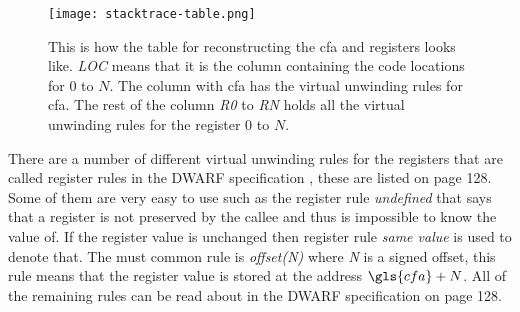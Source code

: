 \begin{figure}[h]
	\centering
	\texttt{[image: stacktrace-table.png]}
	\caption{This is how the table for reconstructing the \gls{cfa} and registers looks like. \emph{LOC} means that it is the column containing the code locations for $0$ to $N$. The column with \gls{cfa} has the virtual unwinding rules for \gls{cfa}. The rest of the column \emph{R0} to \emph{RN} holds all the virtual unwinding rules for the register $0$ to $N$.}
	\label{fig:stacktracetable}
\end{figure}


There are a number of different virtual unwinding rules for the registers that are called register rules in the \gls{DWARF} specification \cite{dwarf}, these are listed on page 128.
Some of them are very easy to use such as the register rule \emph{undefined} that says that a register is not preserved by the callee and thus is impossible to know the value of.
If the register value is unchanged then register rule \emph{same value} is used to denote that.
The must common rule is \emph{offset(N)} where \emph{N} is a signed offset, this rule means that the register value is stored at the address $\gls{cfa}+N$.
All of the remaining rules can be read about in the \gls{DWARF} specification \cite{dwarf} on page 128.



